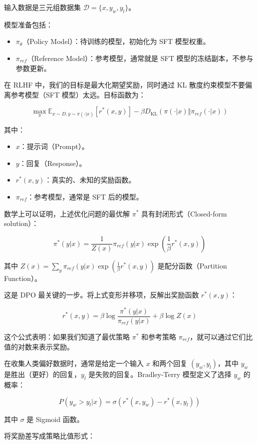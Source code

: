 输入数据是三元组数据集 \(\mathcal{D}=\{x,y_w,y_l\}\)。

模型准备包括：

\begin{itemize}
\tightlist
\item
  \(\pi_\theta\)（Policy Model）：待训练的模型，初始化为 SFT 模型权重。
\item
  \(\pi_{ref}\)（Reference Model）：参考模型，通常就是 SFT 模型的冻结副本，不参与参数更新。
\end{itemize}

在 RLHF 中，我们的目标是最大化期望奖励，同时通过 KL 散度约束模型不要偏离参考模型（SFT 模型）太远。目标函数为：

\[
\max_{\pi}\mathbb{E}_{x\sim D,y\sim\pi(\cdot|x)}[r^*(x,y)]-\beta D_{\mathrm{KL}}(\pi(\cdot|x)\Vert\pi_{ref}(\cdot|x))
\]

其中：

\begin{itemize}
\tightlist
\item
  \(x\)：提示词（Prompt）。
\item
  \(y\)：回复（Response）。
\item
  \(r^*(x,y)\)：真实的、未知的奖励函数。
\item
  \(\pi_{ref}\)：参考模型，通常是 SFT 后的模型。
\end{itemize}

数学上可以证明，上述优化问题的最优解 \(\pi^*\) 具有封闭形式（Closed-form solution）：

\[
\pi^*(y|x)=\frac{1}{Z(x)}\pi_{ref}(y|x)\exp\left(\frac{1}{\beta}r^*(x,y)\right)
\]

其中 \(Z(x)=\sum_y\pi_{ref}(y|x)\exp\left(\frac{1}{\beta}r^*(x,y)\right)\) 是配分函数（Partition Function）。

这是 DPO 最关键的一步。将上式变形并移项，反解出奖励函数 \(r^*(x,y)\)：

\[
r^*(x,y)=\beta\log\frac{\pi^*(y|x)}{\pi_{ref}(y|x)}+\beta\log Z(x)
\]

这个公式表明：如果我们知道了最优策略 \(\pi^*\) 和参考策略 \(\pi_{ref}\)，就可以通过它们比值的对数来表示奖励。

在收集人类偏好数据时，通常是给定一个输入 \(x\) 和两个回复 \((y_w,y_l)\)，其中 \(y_w\) 是胜出（更好）的回复，\(y_l\) 是失败的回复。Bradley-Terry 模型定义了选择 \(y_w\) 的概率：

\[
P(y_w>y_l|x)=\sigma(r^*(x,y_w)-r^*(x,y_l))
\]

其中 \(\sigma\) 是 Sigmoid 函数。

将奖励差写成策略比值形式：

